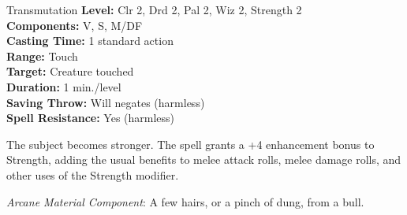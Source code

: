 {Transmutation}
{
	\textbf{Level:}
	Clr 2, Drd 2, Pal 2, Wiz 2, Strength 2\\
	\textbf{Components:}
	V, S, M/DF\\
	\textbf{Casting Time:}
	1 standard action\\
	\textbf{Range:}
	Touch\\
	\textbf{Target:}
	Creature touched\\
	\textbf{Duration:}
	1 min./level\\
	\textbf{Saving Throw:}
	Will negates (harmless)\\
	\textbf{Spell Resistance:}
	Yes (harmless)\\
}
{
	The subject becomes stronger. The spell grants a +4 enhancement bonus to Strength, adding the usual benefits to melee attack rolls, melee damage rolls, and other uses of the Strength modifier.

	\textit{Arcane Material Component}:
	A few hairs, or a pinch of dung, from a bull.

}
